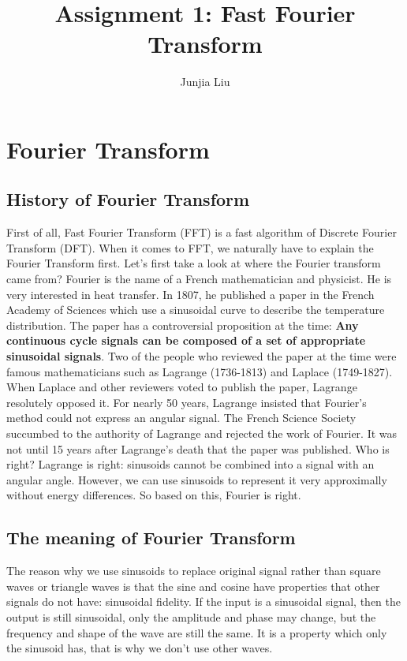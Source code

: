 \documentclass[12pt,a4paper]{article}
\author{Junjia Liu}
\affil{School of Mechanical Engineering, Shanghai Jiaotong University, junjialiu@sjtu.edu.cn}
\title{\textbf{Assignment 1: Fast Fourier Transform}}
\begin{document}
\maketitle

\tableofcontents
\newpage

\section{Fourier Transform}
\subsection{History of Fourier Transform}
First of all, Fast Fourier Transform (FFT) is a fast algorithm of Discrete Fourier Transform (DFT). When it comes to FFT, we naturally have to explain the Fourier Transform first. Let's first take a look at where the Fourier transform came from? Fourier is the name of a French mathematician and physicist. He is very interested in heat transfer. In 1807, he published a paper in the French Academy of Sciences which use a sinusoidal curve to describe the temperature distribution. The paper has a controversial proposition at the time: \textbf{Any continuous cycle signals can be composed of a set of appropriate sinusoidal signals}. Two of the people who reviewed the paper at the time were famous mathematicians such as Lagrange (1736-1813) and Laplace (1749-1827). When Laplace and other reviewers voted to publish the paper, Lagrange resolutely opposed it. For nearly 50 years, Lagrange insisted that Fourier's method could not express an angular signal. The French Science Society succumbed to the authority of Lagrange and rejected the work of Fourier. It was not until 15 years after Lagrange’s death that the paper was published. Who is right? Lagrange is right: sinusoids cannot be combined into a signal with an angular angle. However, we can use sinusoids to represent it very approximally without energy differences. So based on this, Fourier is right.
\subsection{The meaning of Fourier Transform}
The reason why we use sinusoids to replace original signal rather than square waves or triangle waves is that the sine and cosine have properties that other signals do not have: sinusoidal fidelity. If the input is a sinusoidal signal, then the output is still sinusoidal, only the amplitude and phase may change, but the frequency and shape of the wave are still the same. It is a property which only the sinusoid has, that is why we don't use other waves. \\
\end{document}
